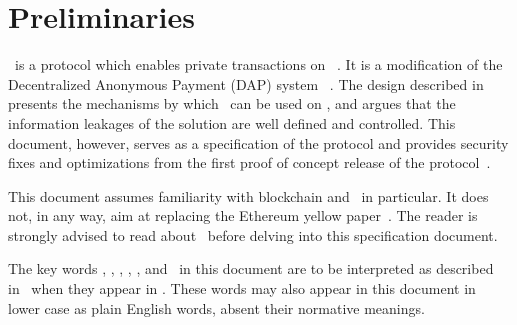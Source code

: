 
\chapter{Preliminaries}\label{chap:preliminaries}

\zeth~is a protocol which enables private transactions on \ethereum~\cite{ethyellowpaper}. It is a modification of the Decentralized Anonymous Payment (DAP) system \zerocash~\cite{sasson2014zerocash}. The design described in~\cite{zethpaper} presents the mechanisms by which \zerocash~can be used on \ethereum, and argues that the information leakages of the solution are well defined and controlled. This document, however, serves as a specification of the protocol and provides security fixes and optimizations from the first proof of concept release of the protocol~\cite{zethsproken}.

\medskip

This document assumes familiarity with blockchain and \ethereum~in particular. It does not, in any way, aim at replacing the Ethereum yellow paper~\cite{ethyellowpaper}. The reader is strongly advised to read about \ethereum~before delving into this specification document.

\medskip

The key words \MUST, \MUSTNOT, \SHOULD, \SHOULDNOT, \MAY, and \RECOMMENDED~in this document are to be interpreted as described in~\cite{rfc2119} when they appear in \ALLCAPS{}. These words may also appear in this document in lower case as plain English words, absent their normative meanings.

